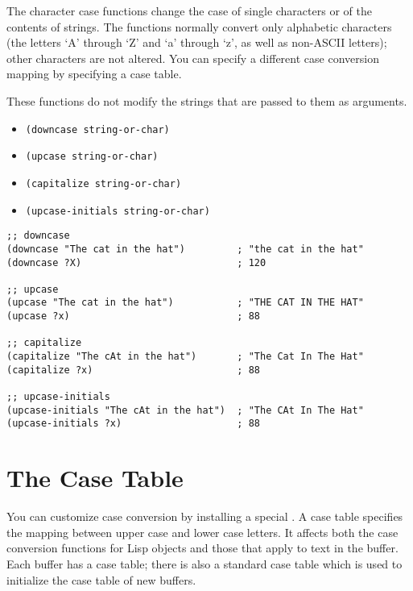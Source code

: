 The character case functions change the case of single characters or of the contents of strings.
The functions normally convert only alphabetic characters (the letters ‘A’ through ‘Z’ and ‘a’ through ‘z’, as well as non-ASCII letters); other characters are not altered. You can specify a different case conversion mapping by specifying a case table.

These functions do not modify the strings that are passed to them as arguments.
\begin{itemize}
\item \lstinline|(downcase string-or-char)|
\item \lstinline|(upcase string-or-char)|  
\item \lstinline|(capitalize string-or-char)|
\item \lstinline|(upcase-initials string-or-char)|
\end{itemize}

\begin{lstlisting}
;; downcase
(downcase "The cat in the hat")         ; "the cat in the hat"
(downcase ?X)                           ; 120

;; upcase
(upcase "The cat in the hat")           ; "THE CAT IN THE HAT"
(upcase ?x)                             ; 88

;; capitalize
(capitalize "The cAt in the hat")       ; "The Cat In The Hat"
(capitalize ?x)                         ; 88

;; upcase-initials
(upcase-initials "The cAt in the hat")  ; "The CAt In The Hat"
(upcase-initials ?x)                    ; 88
\end{lstlisting}

\section{The Case Table}
\label{sec:case-table}

You can customize case conversion by installing a special .
A case table specifies the mapping between upper case and lower case letters.
It affects both the case conversion functions for Lisp objects and those that apply to text in the buffer.
Each buffer has a case table; there is also a standard case table which is used to initialize the case table of new buffers.


